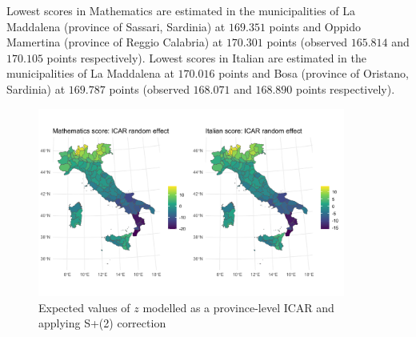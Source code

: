 \documentclass[openany]{book}
\begin{document}
Lowest scores in Mathematics are estimated in the municipalities of La Maddalena (province of Sassari, Sardinia) at $169.351$ points and Oppido Mamertina (province of Reggio Calabria) at $170.301$ points  (observed $165.814$ and $170.105$ points respectively). Lowest scores in Italian are estimated in the municipalities of La Maddalena at $170.016$ points  and Bosa (province of Oristano, Sardinia) at $169.787$ points (observed $168.071$ and $168.890$ points respectively).



\begin{figure}
  \centering
  \includegraphics[width=0.9\textwidth]{Invalsi/z_IMCAR_spatplus_waic.pdf} 
  \caption{Expected values of $z$ modelled as a province-level ICAR and applying S+(2) correction}
  \label{fig:zprov}
\end{figure}
\end{document}
